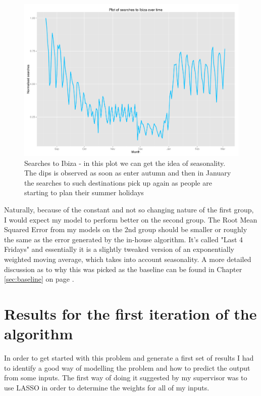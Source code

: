 \documentclass[minf,frontabs,twoside,singlespacing,parskip]{infthesis}
\begin{document}
\begin{figure}[]
\begin{center}
\includegraphics[scale=0.4]{ibiza-searches}
\end{center}
\caption{Searches to Ibiza - in this plot we can get the idea of seasonality. The dips is observed as soon as enter autumn and then in January the searches to such destinations pick up again as people are starting to plan their summer holidays}
\end{figure}

Naturally, because of the constant and not so changing nature of the first group, I would expect my model to perform better on the second group. The Root Mean Squared Error from my models on the 2nd group should be smaller or roughly the same as the error generated by the in-house algorithm. It's called  "Last 4 Fridays" and essentially it is a slightly tweaked version of an exponentially weighted moving average, which takes into account seasonality. A more detailed discussion as to why this was picked as the baseline can be found in Chapter \ref{sec:baseline} on page \pageref{sec:baseline}.


\section{Results for the first iteration of the algorithm}


In order to get started with this problem and generate a first set of results I had to identify a good way of modelling the problem and how to predict the output from some inputs. The first way of doing it suggested by my supervisor was to use LASSO \cite{lasso} in order to determine the weights for all of my inputs. 
\end{document}
